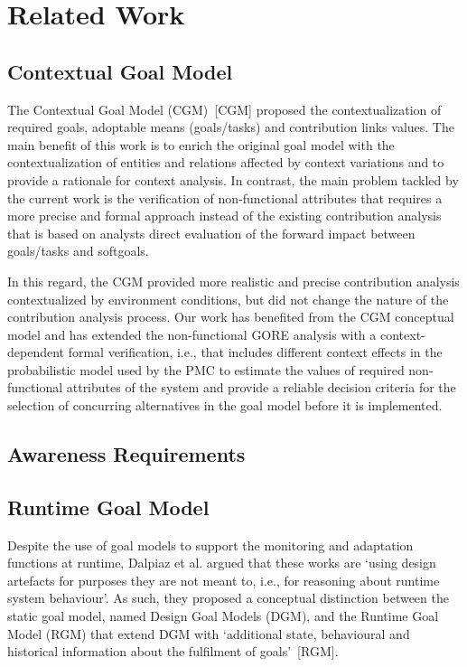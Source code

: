 \chapter{Related Work}\label{ch_related_work}

\section{Contextual Goal Model}

The Contextual Goal Model (CGM)~[CGM] proposed the contextualization of required goals, adoptable means (goals/tasks) and contribution links values. The main benefit of this work is to enrich the original goal model with the contextualization of entities and relations affected by context variations and to provide a rationale for context analysis. In contrast, the main problem tackled by the current work is the verification of non-functional attributes that requires a more precise and formal approach instead of the existing contribution analysis that is based on analysts direct evaluation of the forward impact between goals/tasks and softgoals. 

In this regard, the CGM provided more realistic and precise contribution analysis contextualized by environment conditions, but did not change the nature of the contribution analysis process. Our work has benefited from the CGM conceptual model and has extended the non-functional GORE analysis with a context-dependent formal verification, i.e., that includes different context effects in the probabilistic model used by the PMC to estimate the values of required non-functional attributes of the system and provide a reliable decision criteria for the selection of concurring alternatives in the goal model before it is implemented.

\section{Awareness Requirements}



\section{Runtime Goal Model}

Despite the use of goal models to support the monitoring and adaptation functions at runtime, Dalpiaz et al. argued that these works are `using design artefacts for purposes they are not meant to, i.e., for reasoning about runtime system behaviour'. As such, they proposed a conceptual distinction between the static goal model, named Design Goal Models (DGM), and the Runtime Goal Model (RGM) that extend DGM with `additional state, behavioural and historical information about the fulfilment of goals'~[RGM].

